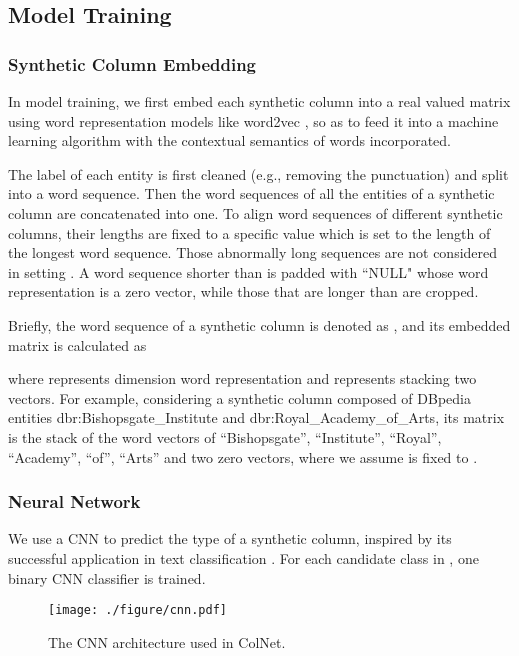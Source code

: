 \documentclass[letterpaper]{article}
\newcommand{\rv}[1]{{\color{black}#1}}
\newcommand{\camera}[1]{{\color{black}#1}}
\newcommand{\ColNet}{\textsf{ColNet}\xspace}
\begin{document}
\subsection{Model Training}

\subsubsection{Synthetic Column Embedding}\label{sec:se}

In model training,
we first embed each synthetic column into a real valued matrix using word representation models \rv{like word2vec \cite{mikolov2013distributed},}
so as to feed it into a machine learning algorithm with the contextual \rv{semantics} of words incorporated.


The label of each entity is first cleaned (e.g., removing the punctuation) and split into a word sequence.
\rv{Then the word sequences of all the entities of a synthetic column are concatenated into one.}
To align word sequences of different synthetic columns, 
their lengths are fixed to a specific value  which is set to the length of the longest word sequence.
\camera{Those abnormally long sequences are not considered in setting .}
\camera{A} word sequence shorter than  is padded with ``NULL" whose word representation is a zero vector,
while those that are longer than  are cropped.




Briefly, the word sequence of a synthetic column  is denoted as ,
and its embedded matrix 
is calculated as 

where  represents  dimension word representation 
and  represents stacking two vectors.
For example, considering a synthetic column composed of DBpedia entities dbr:Bishopsgate\_Institute and dbr:Royal\_Academy\_of\_Arts,
its matrix is the stack of the word vectors of ``Bishopsgate'', ``Institute'', ``Royal'', ``Academy'', ``of'', ``Arts'' and two zero vectors, where we assume  is fixed to . 

\subsubsection{Neural Network}
We use a CNN to predict the type of a synthetic column,
inspired by its successful application in text classification \cite{kim2014convolutional}.
For each candidate class  in , 
one binary CNN classifier  is trained.


\begin{figure}[h]
\centering
\texttt{[image: ./figure/cnn.pdf]}
\caption{The CNN architecture used in \ColNet.
}
\label{fig:cnn}
\end{figure}
\end{document}
